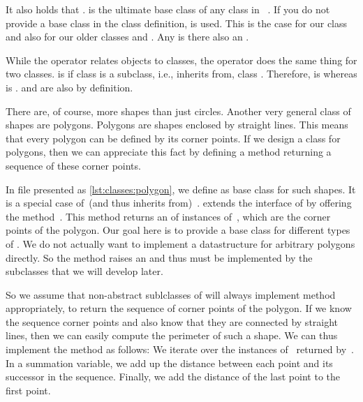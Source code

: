 It also holds that .
 is the ultimate base class of any class in \python~\cite{PSF:P3D:G:O,PSF:P3D:TPSL:BIF:O}.
If you do not provide a base class in the class definition,  is used.
This is the case for our class  and also for our older classes  and .
Any  is there also an .

While the operator  relates objects to classes, the operator  does the same thing for two classes.
 is  if class  is a subclass, i.e., inherits from, class .
Therefore,  is  whereas  is .
 and  are also  by definition.

There are, of course, more shapes than just circles.
Another very general class of shapes are polygons.
Polygons are shapes enclosed by straight lines.
This means that every polygon can be defined by its corner points.
If we design a class for polygons, then we can appreciate this fact by defining a method  returning a sequence of these corner points.

%
%
%
In file  presented as \cref{lst:classes:polygon}, we define  as base class for such shapes.
It is a special case of~(and thus inherits from)~.
 extends the interface of  by offering the method~.
This method returns an  of instances of~, which are the corner points of the polygon.
Our goal here is to provide a base class for different types of .
We do not actually want to implement a datastructure for arbitrary polygons directly.
So the method  raises an  and thus must be implemented by the subclasses that we will develop later.

So we assume that non-abstract sublclasses of  will always implement method  appropriately, to return the sequence of corner points of the polygon.
If we know the sequence corner points and also know that they are connected by straight lines, then we can easily compute the perimeter of such a shape.
We can thus implement the method  as follows:
We iterate over the instances of~ returned by~.
In a summation variable, we add up the distance between each point and its successor in the sequence.
Finally, we add the distance of the last point to the first point.

